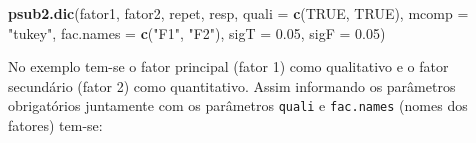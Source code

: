 \documentclass[
]{article}
\newenvironment{Shaded}{\begin{snugshade}}{\end{snugshade}}
\newcommand{\DataTypeTok}[1]{\textcolor[rgb]{0.13,0.29,0.53}{#1}}
\newcommand{\FloatTok}[1]{\textcolor[rgb]{0.00,0.00,0.81}{#1}}
\newcommand{\KeywordTok}[1]{\textcolor[rgb]{0.13,0.29,0.53}{\textbf{#1}}}
\newcommand{\NormalTok}[1]{#1}
\newcommand{\OperatorTok}[1]{\textcolor[rgb]{0.81,0.36,0.00}{\textbf{#1}}}
\newcommand{\OtherTok}[1]{\textcolor[rgb]{0.56,0.35,0.01}{#1}}
\newcommand{\StringTok}[1]{\textcolor[rgb]{0.31,0.60,0.02}{#1}}
\begin{document}
\begin{Shaded}
\begin{Highlighting}[]
\KeywordTok{psub2.dic}\NormalTok{(fator1, fator2, repet, resp, }\DataTypeTok{quali =} \KeywordTok{c}\NormalTok{(}\OtherTok{TRUE}\NormalTok{, }\OtherTok{TRUE}\NormalTok{),}
          \DataTypeTok{mcomp =} \StringTok{"tukey"}\NormalTok{, }\DataTypeTok{fac.names =} \KeywordTok{c}\NormalTok{(}\StringTok{"F1"}\NormalTok{, }\StringTok{"F2"}\NormalTok{), }
          \DataTypeTok{sigT =} \FloatTok{0.05}\NormalTok{, }\DataTypeTok{sigF =} \FloatTok{0.05}\NormalTok{)}
\end{Highlighting}
\end{Shaded}

No exemplo tem-se o fator principal (fator 1) como qualitativo e o fator secundário (fator 2) como quantitativo. Assim informando os parâmetros obrigatórios juntamente com os parâmetros \texttt{quali} e \texttt{fac.names} (nomes dos fatores) tem-se:

\begin{Shaded}
\end{Shaded}
\end{document}
